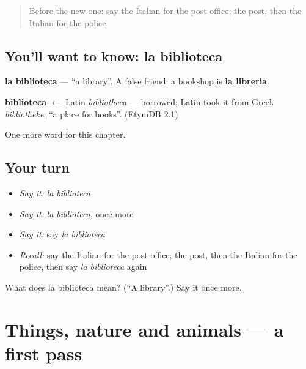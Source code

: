 \label{lesson:IT-C84-biblioteca}



\begin{quote}
Before the new one: say the Italian for the post office; the post, then the Italian for the police.
\end{quote}

\subsection*{You'll want to know: la biblioteca}
\textbf{la biblioteca} — \textquotedblleft{}a library\textquotedblright{}. A false friend: a bookshop is \textbf{la libreria}.

\begin{cousinweb}
\textbf{biblioteca} $\leftarrow$ Latin \emph{bibliotheca} — borrowed; Latin took it from Greek \emph{bibliotheke}, \textquotedblleft{}a place for books\textquotedblright{}. (EtymDB 2.1)
\end{cousinweb}

\begin{grammarlens}[title={What you've built}]
One more word for this chapter.
\end{grammarlens}

\subsection*{Your turn}
\begin{itemize}
\raggedright
  \item \emph{Say it:} \emph{la biblioteca}
  \item \emph{Say it:} \emph{la biblioteca}, once more
  \item \emph{Say it:} say \emph{la biblioteca}
  \item \emph{Recall:} say the Italian for the post office; the post, then the Italian for the police, then say \emph{la biblioteca} again
\end{itemize}

\begin{tcolorbox}[breakable,colback=teal!4,colframe=teal!35!black,title={Before you move on}]
What does la biblioteca mean? (\textquotedblleft{}A library\textquotedblright{}.) Say it once more.
\end{tcolorbox}
\section[(dialogue)]{Things, nature and animals — a first pass}

